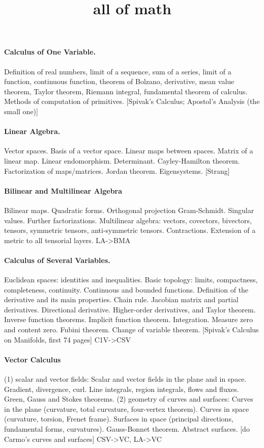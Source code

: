 \title{all of math}

\paragraph{Calculus of One Variable.}
Definition of real numbers, limit of a sequence, sum of a series, limit of a
function, continuous function, theorem of Bolzano, derivative, mean value
theorem, Taylor theorem, Riemann integral, fundamental theorem of calculus.
Methods of computation of primitives.
[Spivak's Calculus; Apostol's Analysis (the small one)]
{}

\paragraph{Linear Algebra.}
Vector spaces.  Basis of a vector space.  Linear maps between spaces.  Matrix
of a linear map.  Linear endomorphism.  Determinant.  Cayley-Hamilton
theorem.  Factorization of maps/matrices.  Jordan theorem.  Eigensystems.
[Strang]
{}

\paragraph{Bilinear and Multilinear Algebra}
Bilinear maps.  Quadratic forms.
Orthogonal projection
Gram-Schmidt.
Singular values.  Further factorizations.
Multilinear algebra: vectors, covectors, bivectors, tensors, symmetric
tensors, anti-symmetric tensors.  Contractions.
Extension of a metric to all tensorial layers.
{LA->BMA}

\paragraph{Calculus of Several Variables.}
Euclidean spaces: identities and inequalities.
Basic topology: limits, compactness, completeness, continuity.
Continuous and bounded functions.
Definition of the derivative and its main properties.
Chain rule.
Jacobian matrix and partial derivatives.
Directional derivative.
Higher-order derivatives, and Taylor theorem.
Inverse function theorems.
Implicit function theorem.
Integration.  Measure zero and content zero.
Fubini theorem.  Change of variable theorem.
[Spivak's Calculus on Manifolds, first 74 pages]
{C1V->CSV}


\paragraph{Vector Calculus}
(1) scalar and vector fields:
Scalar and vector fields in the plane and in space.
Gradient, divergence, curl.
Line integrals, region integrals, flows and fluxes.
Green, Gauss and Stokes theorems.
(2) geometry of curves and surfaces:
Curves in the plane (curvature, total curvature, four-vertex theorem).
Curves in space (curvature, torsion, Frenet frame).
Surfaces in space (principal directions, fundamental forms, curvatures).
Gauss-Bonnet theorem.
Abstract surfaces.
[do Carmo's curves and surfaces]
{CSV->VC, LA->VC}

